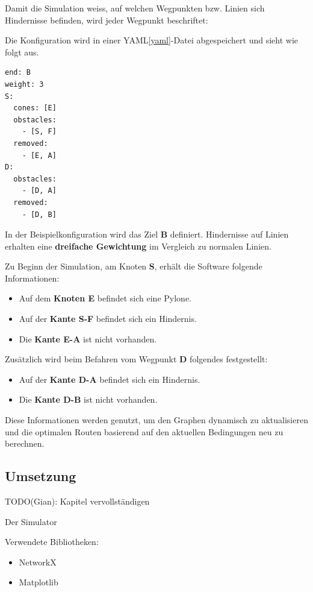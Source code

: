 \documentclass[../main.tex]{subfiles}
\begin{document}
Damit die Simulation weiss, auf welchen Wegpunkten bzw. Linien sich Hindernisse befinden, wird jeder Wegpunkt beschriftet:


Die Konfiguration wird in einer YAML\ref{yaml}-Datei abgespeichert und sieht wie folgt aus.

\begin{verbatim}
end: B
weight: 3
S:
  cones: [E]
  obstacles: 
    - [S, F] 
  removed:
    - [E, A]
D:
  obstacles:
    - [D, A]
  removed:
    - [D, B]
\end{verbatim}

In der Beispielkonfiguration wird das Ziel \textbf{B} definiert. Hindernisse auf Linien erhalten eine \textbf{dreifache Gewichtung} im Vergleich zu normalen Linien. 

Zu Beginn der Simulation, am Knoten \textbf{S}, erhält die Software folgende Informationen:
\begin{itemize}
    \item Auf dem \textbf{Knoten E} befindet sich eine Pylone.
    \item Auf der \textbf{Kante S-F} befindet sich ein Hindernis.
    \item Die \textbf{Kante E-A} ist nicht vorhanden.
\end{itemize}

Zusätzlich wird beim Befahren vom Wegpunkt \textbf{D} folgendes festgestellt:
\begin{itemize}
    \item Auf der \textbf{Kante D-A} befindet sich ein Hindernis.
    \item Die \textbf{Kante D-B} ist nicht vorhanden.
\end{itemize}

Diese Informationen werden genutzt, um den Graphen dynamisch zu aktualisieren und die optimalen Routen basierend auf den aktuellen Bedingungen neu zu berechnen.


\subsection{Umsetzung}

TODO(Gian): Kapitel vervollständigen

Der Simulator 

Verwendete Bibliotheken:

\begin{itemize}
    \item NetworkX
    \item Matplotlib
\end{itemize}
\end{document}

